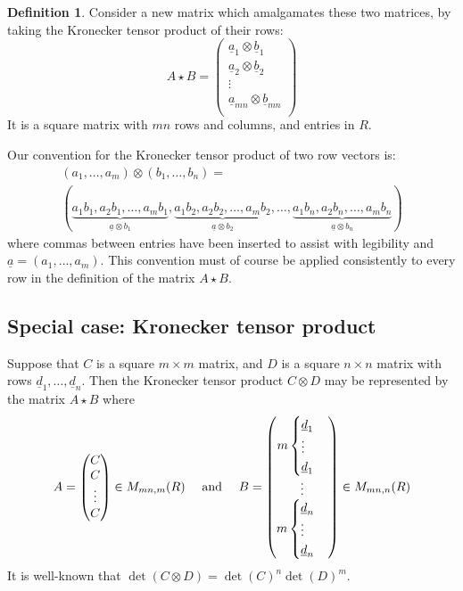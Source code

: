 \documentclass[10pt]{amsart}
\theoremstyle{definition}
\newtheorem{defn}[thm]{Definition}
\theoremstyle{remark}
\numberwithin{equation}{section}
\newcommand{\0}{\color{blue}{\mathsf{0}}}
\begin{document}
  \begin{defn}  Consider  a new matrix which   amalgamates  these two matrices,  by taking the Kronecker tensor product of their  rows:
 \[  
 A \star B =     \begin{pmatrix} \underline{a}_1 \otimes   \underline{b}_1 \\ 
  \underline{a}_2 \otimes \underline{b}_2 \\ 
      \vdots \\
 \underline{a}_{mn} \otimes  \underline{b}_{mn} \\ 
 \end{pmatrix}  \]
 It is a square matrix with  $mn$ rows and columns, and entries in $R$.  
 \end{defn} Our convention for the Kronecker tensor product of two row vectors is:
 \begin{multline}  \label{KroneckerTensorConvention} (a_1  ,  \ldots ,  a_m) \otimes (b_1,   \ldots  , b_n)  =   \\ 
   ( \underbrace{a_1 b_1  ,  a_2 b_1  ,  \ldots ,   a_m b_1}_{\underline{a} \otimes b_1} , \underbrace{a_1 b_2 , a_2 b_2 , \ldots, a_m b_2}_{\underline{a} \otimes b_2}  , \ldots ,   \underbrace{a_1 b_n , a_2 b_n , \ldots, a_m b_n}_{\underline{a} \otimes b_n}   )  \end{multline} 
 where commas between entries have been inserted to assist with  legibility and $\underline{a} = (a_1,\ldots, a_m)$.  This convention must of course be applied consistently to every row in the definition of the matrix $A \star B$.  \subsection{Special case: Kronecker tensor product}
 Suppose that $C$ is a square $m\times m$ matrix, and $D$ is a square $n\times n$ matrix with rows $\underline{d}_1,\ldots, \underline{d}_n$. Then the Kronecker tensor product $C\otimes D$ may be represented by the matrix $A \star B$ where
 \begin{equation} \label{KroneckerCase} A =  \begin{pmatrix}    C  \\  C  \\  \vdots\\  C \end{pmatrix} \in M_{mn,m}(R)   \quad \hbox{ and } \quad B =   \begin{pmatrix}    m\begin{cases} \underline{d}_1\\ \vdots\\ \underline{d}_1 \end{cases} \\ \vdots \\ m\begin{cases} \underline{d}_n\\ \vdots\\ \underline{d}_n \end{cases}   \\  \end{pmatrix}\in M_{mn,n}(R) 
\end{equation}
It is well-known that $\det(C \otimes D) = \det(C)^n \det(D)^m$. 
 
\end{document}

